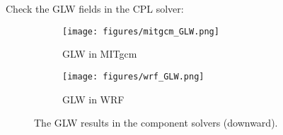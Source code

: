 
Check the GLW fields in the CPL solver:

\begin{figure}[h!]
\centering
  \begin{subfigure}[b]{0.4\linewidth}
  \texttt{[image: figures/mitgcm\_GLW.png]}
  \caption{GLW in MITgcm}
  \end{subfigure}
  \begin{subfigure}[b]{0.4\linewidth}
  \texttt{[image: figures/wrf\_GLW.png]}
  \caption{GLW in WRF}
  \end{subfigure}
  \caption{The GLW results in the component solvers (downward).}
\label{fig:glw}
\end{figure}
